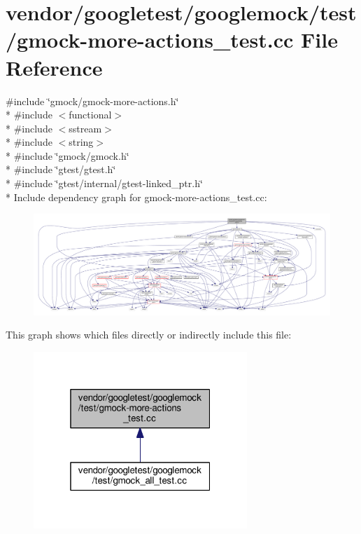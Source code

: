 \hypertarget{gmock-more-actions__test_8cc}{}\section{vendor/googletest/googlemock/test/gmock-\/more-\/actions\+\_\+test.cc File Reference}
\label{gmock-more-actions__test_8cc}
{\ttfamily \#include \char`\"{}gmock/gmock-\/more-\/actions.\+h\char`\"{}}\\*
{\ttfamily \#include $<$functional$>$}\\*
{\ttfamily \#include $<$sstream$>$}\\*
{\ttfamily \#include $<$string$>$}\\*
{\ttfamily \#include \char`\"{}gmock/gmock.\+h\char`\"{}}\\*
{\ttfamily \#include \char`\"{}gtest/gtest.\+h\char`\"{}}\\*
{\ttfamily \#include \char`\"{}gtest/internal/gtest-\/linked\+\_\+ptr.\+h\char`\"{}}\\*
Include dependency graph for gmock-\/more-\/actions\+\_\+test.cc\+:
\nopagebreak
\begin{figure}[H]
\begin{center}
\leavevmode
\includegraphics[width=350pt]{gmock-more-actions__test_8cc__incl}
\end{center}
\end{figure}
This graph shows which files directly or indirectly include this file\+:
\nopagebreak
\begin{figure}[H]
\begin{center}
\leavevmode
\includegraphics[width=229pt]{gmock-more-actions__test_8cc__dep__incl}
\end{center}
\end{figure}
